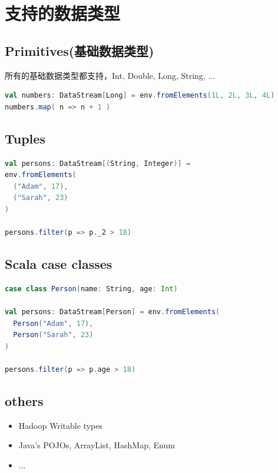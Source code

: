 \documentclass[oneside]{ctexbook}
\begin{document}
\section{支持的数据类型}

\subsection{Primitives(基础数据类型)}

所有的基础数据类型都支持，Int, Double, Long, String, ...

\begin{lstlisting}[language=scala, breaklines]
val numbers: DataStream[Long] = env.fromElements(1L, 2L, 3L, 4L)
numbers.map( n => n + 1 )
\end{lstlisting}

\subsection{Tuples}

\begin{lstlisting}[language=scala, breaklines]
val persons: DataStream[(String, Integer)] =
env.fromElements(
  ("Adam", 17),
  ("Sarah", 23)
)

persons.filter(p => p._2 > 18)
\end{lstlisting}

\subsection{Scala case classes}

\begin{lstlisting}[language=scala, breaklines]
case class Person(name: String, age: Int)

val persons: DataStream[Person] = env.fromElements(
  Person("Adam", 17),
  Person("Sarah", 23)
)

persons.filter(p => p.age > 18)
\end{lstlisting}

\subsection{others}

\begin{itemize}
\item Hadoop Writable types
\item Java's POJOs, ArrayList, HashMap, Enum
\item ...
\end{itemize}
\end{document}
